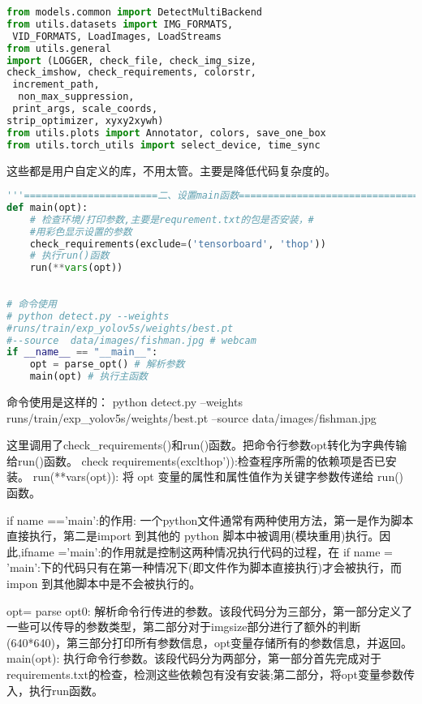 \begin{lstlisting}[language=python]
from models.common import DetectMultiBackend
from utils.datasets import IMG_FORMATS,
 VID_FORMATS, LoadImages, LoadStreams
from utils.general 
import (LOGGER, check_file, check_img_size, 
check_imshow, check_requirements, colorstr,
 increment_path, 
  non_max_suppression,
 print_args, scale_coords, 
strip_optimizer, xyxy2xywh)
from utils.plots import Annotator, colors, save_one_box
from utils.torch_utils import select_device, time_sync
\end{lstlisting}
这些都是用户自定义的库，不用太管。主要是降低代码复杂度的。
\begin{lstlisting}[language=python]
'''=======================二、设置main函数==================================='''
def main(opt):
    # 检查环境/打印参数,主要是requrement.txt的包是否安装，#
    #用彩色显示设置的参数
    check_requirements(exclude=('tensorboard', 'thop'))
    # 执行run()函数
    run(**vars(opt))
 
 
# 命令使用
# python detect.py --weights 
#runs/train/exp_yolov5s/weights/best.pt 
#--source  data/images/fishman.jpg # webcam
if __name__ == "__main__":
    opt = parse_opt() # 解析参数
    main(opt) # 执行主函数
\end{lstlisting}
 
命令使用是这样的：
python detect.py --weights runs/train/exp_yolov5s/weights/best.pt --source  data/images/fishman.jpg 

这里调用了check_requirements()和run()函数。把命令行参数opt转化为字典传输给run()函数。
check requirements(exclthop')):检查程序所需的依赖项是否已安装。
run(**vars(opt)): 将 opt 变量的属性和属性值作为关键字参数传递给 run() 函数。

if name =='main’:的作用:
一个python文件通常有两种使用方法，第一是作为脚本直接执行，第二是import 到其他的 python 脚本中被调用(模块重用)执行。因此,ifname ='main’:的作用就是控制这两种情况执行代码的过程，在 if name = 'main':下的代码只有在第一种情况下(即文件作为脚本直接执行)才会被执行，而impon 到其他脚本中是不会被执行的。

opt= parse opt0: 解析命令行传进的参数。该段代码分为三部分，第一部分定义了一些可以传导的参数类型，第二部分对于imgsize部分进行了额外的判断(640*640)，第三部分打印所有参数信息，opt变量存储所有的参数信息，并返回。main(opt): 执行命令行参数。该段代码分为两部分，第一部分首先完成对于requirements.txt的检查，检测这些依赖包有没有安装;第二部分，将opt变量参数传入，执行run函数。